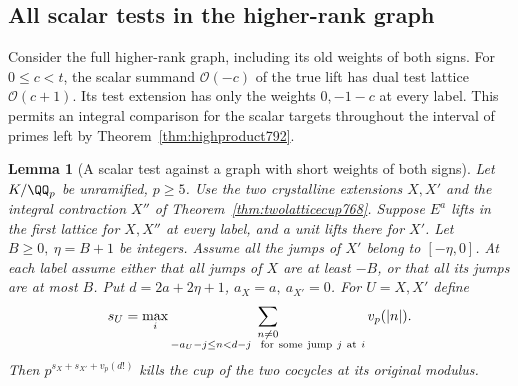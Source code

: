 \documentclass[a4paper,11pt]{article}
\newtheorem{lemma}[proposition]{Lemma}
\theoremstyle{definition}
\theoremstyle{remark}
\numberwithin{equation}{section}
\begin{document}
\subsection{All scalar tests in the higher-rank graph}
\label{sec:highscalars793}
Consider the full higher-rank graph, including its old weights
of both signs. For \(0\le c<t\), the scalar summand
\(\mathcal O(-c)\) of the true lift has dual test lattice
\(\mathcal O(c+1)\). Its test extension has only the weights
\(0,-1-c\) at every label. This permits an integral comparison
for the scalar targets throughout the interval of primes
left by Theorem~\ref{thm:highproduct792}.

\begin{lemma}[A scalar test against a graph with short weights of both signs]
\leavevmode\label{lem:shortgraph793}
Let \(K/\QQ_p\) be unramified, \(p\ge5\). Use the two crystalline
extensions \(X,X'\) and the integral contraction \(X''\) of
Theorem~\ref{thm:twolatticecup768}. Suppose \(E^a\) lifts in
the first lattice for \(X,X''\) at every label, and a unit
lifts there for \(X'\). Let \(B\ge0,\ \eta=B+1\) be integers.
Assume all the jumps of \(X'\) belong to \([-\eta,0]\).
At each label assume either that all jumps of \(X\) are at
least \(-B\), or that all its jumps are at most \(B\).
Put \(d=2a+2\eta+1\), \(a_X=a,\ a_{X'}=0\). For \(U=X,X'\)
define
\[
   s_U=\max_i
       \sum_{\substack{n\ne0\\ -a_U-j\le n<d-j\
                         {\rm\ for\ some\ jump}\ j\ {\rm at}\ i}}
                         v_p(|n|).
\]
Then \(p^{s_X+s_{X'}+v_p(d!)}\) kills the cup of the two
cocycles at its original modulus.
\end{lemma}
\end{document}
